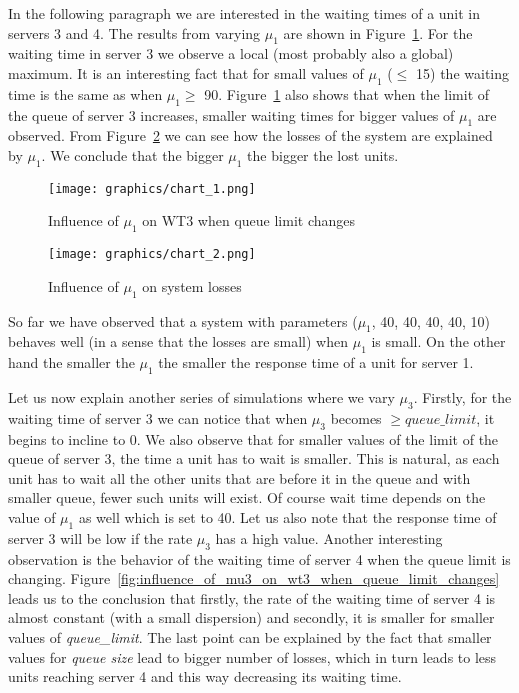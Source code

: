 \documentclass[12pt]{article}
\theoremstyle{plain}
\begin{document}
In the following paragraph we are interested in the waiting times of a unit in servers 3 and 4. The results
from varying $\mu_1$ are shown in Figure~\ref{fig:influence_of_mu1_on_wt3_when_queue_limit_changes}. For the waiting time in
server 3 we observe a local (most probably also a global) maximum. It is an interesting
fact that for small values of $\mu_1$ ($\le$ 15) the waiting time is the same as when
$\mu_1 \ge$ 90. Figure~\ref{fig:influence_of_mu1_on_wt3_when_queue_limit_changes} also shows that when the limit of the queue of
server 3 increases, smaller waiting times for bigger values of $\mu_1$ are
observed. From Figure~\ref{fig:influence_of_mu1_on_system:losses} we can see how the losses of the system are
explained by $\mu_1$. We conclude that the bigger $\mu_1$ the bigger the lost
units.

\begin{figure}
  \caption{Influence of $\mu_1$ on WT3 when queue limit changes}
  \texttt{[image: graphics/chart\_1.png]}\\
  \label{fig:influence_of_mu1_on_wt3_when_queue_limit_changes}
\end{figure}
\begin{figure}
  \caption{Influence of $\mu_1$ on system losses}
  \texttt{[image: graphics/chart\_2.png]}\\
  \label{fig:influence_of_mu1_on_system:losses}
\end{figure}

So far we have observed that a system with parameters ($\mu_1$, 40, 40, 40,
40, 10) behaves well (in a sense that the losses are small) when $\mu_1$ is small.
On the other hand the smaller the $\mu_1$ the smaller the response time of a unit
for server 1.

Let us now explain another series of simulations where we vary $\mu_3$. Firstly, for the waiting time
of server 3 we can notice that when $\mu_3$ becomes $\ge queue\_limit$, it begins
to incline to 0. We also observe that for smaller values of the limit of the queue
of server 3, the time a unit has to wait is smaller. This is natural, as each
unit has to wait all the other units that are before it in the queue and with
smaller queue, fewer such units will exist. Of course wait time depends on the
value of $\mu_1$ as well which is set to 40. Let us also note that the response time of server 3 will be
low if the rate $\mu_3$ has a high value. Another interesting observation is the behavior
of the waiting time of server 4 when the queue limit is changing.
Figure~\ref{fig:influence_of_mu3_on_wt3_when_queue_limit_changes} leads
us to the conclusion that firstly, the rate of the waiting time of server 4 is almost
constant (with a small dispersion) and secondly, it is smaller for smaller values
of \emph{queue\_limit}. The last point can be explained by the fact that smaller values
for \emph{queue size} lead to bigger number of losses, which in turn leads to
less units reaching server 4 and this way decreasing its waiting time.
\end{document}
